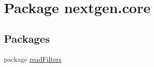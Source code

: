 \hypertarget{namespacenextgen_1_1core}{\section{Package nextgen.\+core}
\label{namespacenextgen_1_1core}
}
\subsection*{Packages}
\begin{DoxyCompactItemize}
\item 
package \hyperlink{namespacenextgen_1_1core_1_1read_filters}{read\+Filters}
\end{DoxyCompactItemize}

